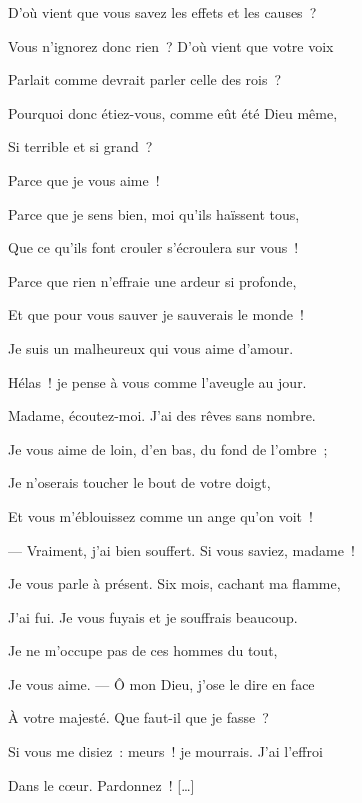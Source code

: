 {D'où vient que vous savez les effets et les causes~?

Vous n'ignorez donc rien~? D'où vient que votre voix

Parlait comme devrait parler celle des rois~?

Pourquoi donc étiez-vous, comme eût été Dieu même,

Si terrible et si grand~?

\vspace*{45pt}


\phantom{Si terrible et si grand~? }Parce que je vous aime~!

Parce que je sens bien, moi qu'ils haïssent tous,

Que ce qu'ils font crouler s'écroulera sur vous~!

Parce que rien n'effraie une ardeur si profonde,

Et que pour vous sauver je sauverais le monde~!

Je suis un malheureux qui vous aime d'amour.

Hélas~! je pense à vous comme l'aveugle au jour.

Madame, écoutez-moi. J'ai des rêves sans nombre.

Je vous aime de loin, d'en bas, du fond de l'ombre~;

Je n'oserais toucher le bout de votre doigt,

Et vous m'éblouissez comme un ange qu'on voit~!

--- Vraiment, j'ai bien souffert. Si vous saviez, madame~!

Je vous parle à présent. Six mois, cachant ma flamme,

J'ai fui. Je vous fuyais et je souffrais beaucoup.

Je ne m'occupe pas de ces hommes du tout,

Je vous aime. --- Ô mon Dieu, j'ose le dire en face

À votre majesté. Que faut-il que je fasse~?

Si vous me disiez~: meurs~! je mourrais. J'ai l'effroi

Dans le cœur. Pardonnez~! […]

\setlength{\parskip}{6pt}
}



